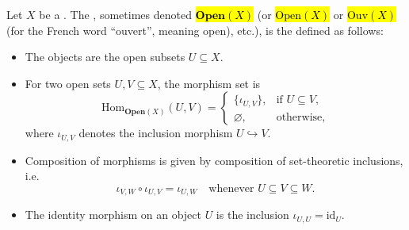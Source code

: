 
\begin{definition} \label{definition:category_of_opens_of_a_topological_space}
    Let $X$ be a . The , sometimes denoted \hl{$\mathbf{Open}(X)$} (or \hl{$\mathrm{Open}(X)$} or \hl{$\mathrm{Ouv}(X)$} (for the French word ``ouvert'', meaning open), etc.), is the   defined as follows:
    \begin{itemize}
        \item The objects are the open subsets $U \subseteq X$.
        \item For two open sets $U, V \subseteq X$, the morphism set is
        $$\mathrm{Hom}_{\mathbf{Open}(X)}(U,V) =
        \begin{cases}
        \{\iota_{U,V}\}, & \text{if } U \subseteq V, \\
        \varnothing, & \text{otherwise},
        \end{cases}$$
        where $\iota_{U,V}$ denotes the inclusion morphism $U \hookrightarrow V$.
        \item Composition of morphisms is given by composition of set-theoretic inclusions, i.e.
        $$\iota_{V,W} \circ \iota_{U,V} = \iota_{U,W} \quad \text{whenever } U \subseteq V \subseteq W.$$
        \item The identity morphism on an object $U$ is the inclusion $\iota_{U,U} = \mathrm{id}_U$.
    \end{itemize}

\end{definition}
